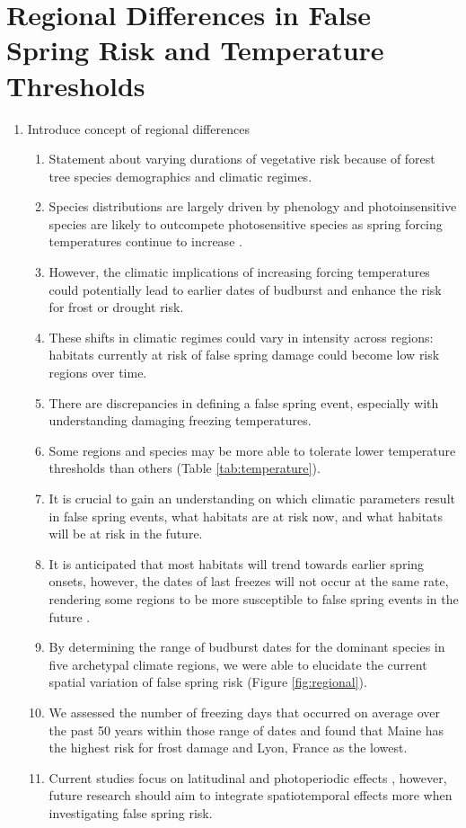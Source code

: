 \documentclass{article}\usepackage[]{graphicx}\usepackage[]{color}
\begin{document}
\section*{Regional Differences in False Spring Risk and Temperature Thresholds}
\begin{enumerate}
\item Introduce concept of regional differences
\begin {enumerate}
\item Statement about varying durations of vegetative risk because of forest tree species demographics and climatic regimes.
\item Species distributions are largely driven by phenology \citep{Chuine2001} and photoinsensitive species are likely to outcompete photosensitive species as spring forcing temperatures continue to increase \cite{Vitasse2011,Gauzere2017}.
\item However, the climatic implications of increasing forcing temperatures could potentially lead to earlier dates of budburst and enhance the risk for frost or drought risk. 
\item These shifts in climatic regimes could vary in intensity across regions: habitats currently at risk of false spring damage could become low risk regions over time. 
\item There are discrepancies in defining a false spring event, especially with understanding damaging freezing temperatures.
\item Some regions and species may be more able to tolerate lower temperature thresholds than others (Table \ref{tab:temperature}).
\item It is crucial to gain an understanding on which climatic parameters result in false spring events, what habitats are at risk now, and what habitats will be at risk in the future. 
\item It is anticipated that most habitats will trend towards earlier spring onsets, however, the dates of last freezes will not occur at the same rate, rendering some regions to be more susceptible to false spring events in the future \citep{Labe2016}.
\item By determining the range of budburst dates for the dominant species in five archetypal climate regions, we were able to elucidate the current spatial variation of false spring risk (Figure \ref{fig:regional}).
\item We assessed the number of freezing days \citep{Schwartz1993} that occurred on average over the past 50 years within those range of dates and found that Maine has the highest risk for frost damage and Lyon, France as the lowest. 
\item Current studies focus on latitudinal and photoperiodic effects \citep{Partanen2004, Viheraaarnio2006, Caffarra2011, Gauzere2017}, however, future research should aim to integrate spatiotemporal effects more when investigating false spring risk.
\end {enumerate}
\end{enumerate}
\end{document}
